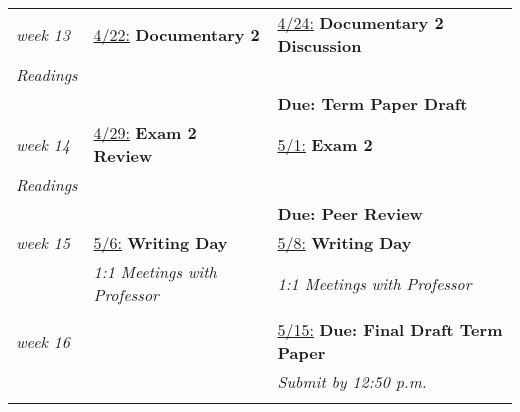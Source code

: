 \documentclass[11pt, letterpaper]{article}
\begin{document}
\begin{center}
\begin{longtable}{p{2cm} | p{6.8cm} | p{6.8cm}}
    \emph{week 13} & \underline{4/22:} \textbf{Documentary 2} & \underline{4/24:} \textbf{Documentary 2 Discussion} \\
    \emph{Readings} &  &  \\
    & & \textbf{Due: Term Paper Draft} \\\hline
    
    \emph{week 14} & \underline{4/29:} \textbf{Exam 2 Review} & \underline{5/1:} \textbf{Exam 2} \\
    \emph{Readings} & & \\
    & & \textbf{Due: Peer Review} \\\hline
    
    \emph{week 15} & \underline{5/6:} \textbf{Writing Day} & \underline{5/8:} \textbf{Writing Day} \\
    & \textit{1:1 Meetings with Professor} & \textit{1:1 Meetings with Professor} \\
    & & \\\hline
    
    \emph{week 16} & & \underline{5/15:} \textbf{Due: Final Draft Term Paper} \\
    & & \textit{Submit by 12:50 p.m.} \\
    & & \\\hline
\end{longtable}
\end{center}
\end{document}
